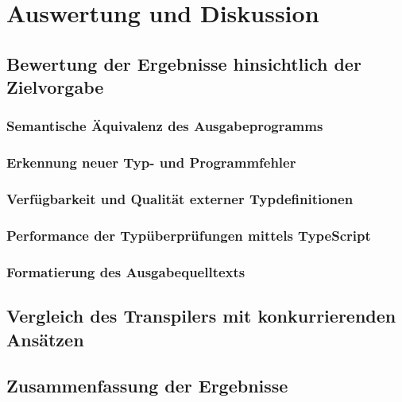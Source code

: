 \chapter{Auswertung und Diskussion}
\label{chap:evaluation}


\section{Bewertung der Ergebnisse hinsichtlich der Zielvorgabe}

  \subsection{Semantische Äquivalenz des Ausgabeprogramms}

  \subsection{Erkennung neuer Typ- und Programmfehler}

  \subsection{Verfügbarkeit und Qualität externer Typdefinitionen}

  \subsection{Performance der Typüberprüfungen mittels TypeScript}

  \subsection{Formatierung des Ausgabequelltexts}

\section{Vergleich des Transpilers mit konkurrierenden Ansätzen}

\section{Zusammenfassung der Ergebnisse}
